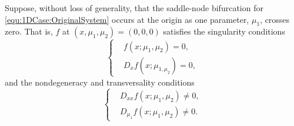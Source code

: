 \documentclass[12pt]{article}
\begin{document}
Suppose, without loss of generality, that the saddle-node bifurcation for \eqref{equ:1DCase:OriginalSystem} occurs at the origin as one parameter, $\mu_{1}$, crosses zero. That is, $f$ at $(x,\mu_{1}, \mu_{2})=(0,0,0)$ satisfies the singularity conditions
\begin{equation}
    \left\{ \begin{aligned}
    &f(x;\mu_{1},\mu_{2})=0, \\
    &D_{x}f(x;\mu_{1,\mu_{2}})=0,
    \end{aligned}\right.
    \label{equ:1DCase:SingularitySystem}
\end{equation}
and the nondegeneracy and transversality conditions
\begin{equation}
    \left\{ \begin{aligned}
    &D_{xx}f(x;\mu_{1},\mu_{2})\neq 0, \\
    &D_{\mu_{1}}f(x;\mu_{1},\mu_{2})\neq 0.
    \end{aligned}\right.
    \label{equ:1DCase:NondegeneracyAndTransversalitySystem}
\end{equation}
\end{document}
